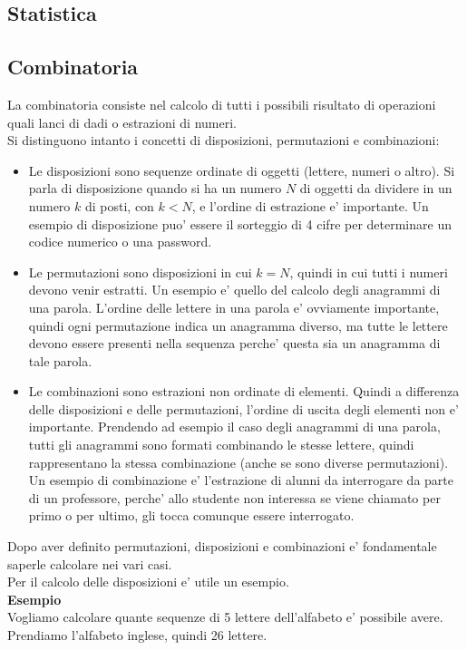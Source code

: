 \documentclass[12pt]{article}
\begin{document}
\subsection{Statistica}
\subsection{Combinatoria}
La combinatoria consiste nel calcolo di tutti i possibili risultato di operazioni quali lanci di dadi o estrazioni di numeri. \\
Si distinguono intanto i concetti di disposizioni, permutazioni e combinazioni:
\begin{itemize}
	\item Le disposizioni sono sequenze ordinate di oggetti (lettere, numeri o altro). Si parla di disposizione quando si ha un numero $N$ di oggetti da dividere in un numero $k$ di posti, con $k<N$, e l'ordine di estrazione e' importante. Un esempio di disposizione puo' essere il sorteggio di 4 cifre per determinare un codice numerico o una password.
	\item Le permutazioni sono disposizioni in cui $k = N$, quindi in cui tutti i numeri devono venir estratti. Un esempio e' quello del calcolo degli anagrammi di una parola. L'ordine delle lettere in una parola e' ovviamente importante, quindi ogni permutazione indica un anagramma diverso, ma tutte le lettere devono essere presenti nella sequenza perche' questa sia un anagramma di tale parola.
	\item Le combinazioni sono estrazioni non ordinate di elementi. Quindi a differenza delle disposizioni e delle permutazioni, l'ordine di uscita degli elementi non e' importante. Prendendo ad esempio il caso degli anagrammi di una parola, tutti gli anagrammi sono formati combinando le stesse lettere, quindi rappresentano la stessa combinazione (anche se sono diverse permutazioni). Un esempio di combinazione e' l'estrazione di alunni da interrogare da parte di un professore, perche' allo studente non interessa se viene chiamato per primo o per ultimo, gli tocca comunque essere interrogato. 
\end{itemize}
Dopo aver definito permutazioni, disposizioni e combinazioni e' fondamentale saperle calcolare nei vari casi. \\
Per il calcolo delle disposizioni e' utile un esempio. \\
\textbf{Esempio} \\
Vogliamo calcolare quante sequenze di 5 lettere dell'alfabeto e' possibile avere. Prendiamo l'alfabeto inglese, quindi 26 lettere. \\
\end{document}
